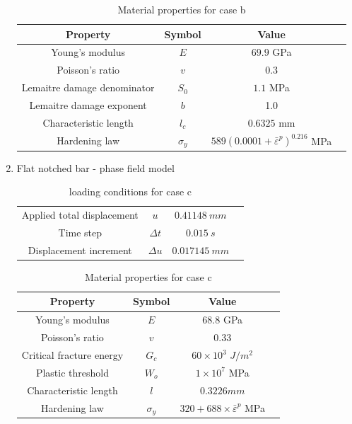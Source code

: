 \documentclass[sn-mathphys,Numbered,draft]{sn-jnl}%
\begin{document}
\begin{enumerate}[label=(\alph*)]
\begin{table}[htb]
	\centering
		\begin{tabular}{cccc} \hline
			Property & Symbol & Value  \\ \hline 
			Young's modulus & $E$ & $69.9$ GPa \\
			Poisson's ratio & $v$ & $0.3$   \\
			Lemaitre damage denominator & $S_0$ & $1.1$ MPa  \\
			Lemaitre damage exponent & $b$ & 1.0  \\
			Characteristic length & $l_c$ & $0.6325$ mm  \\
			Hardening law & $\sigma_y$ & $589({0.0001+\bar{\varepsilon}}^p)^{0.216}$ MPa \\
			\hline
		\end{tabular}
	\caption{Material properties for case b}
	\label{tab:material_properties}
\end{table}

\item Flat notched bar - phase field model
\begin{table}[htb]
	\centering
		\begin{tabular}{cccc} \hline
		    Applied total displacement & $u$ & $0.41148\ mm$ \\
		    Time step & $\Delta t$ & $0.015\ s$ \\
			Displacement increment  & $\Delta u$ & $0.017145\ mm$   \\
			\hline
		\end{tabular}
	\caption{loading conditions for case c}
	\label{tab:material_properties}
\end{table}

\begin{table}[htb]
	\centering
		\begin{tabular}{cccc} \hline
			Property & Symbol & Value  \\ \hline 
			Young's modulus & $E$ & $68.8$ GPa \\
			Poisson's ratio & $v$ & $0.33$   \\
			Critical fracture energy & $G_c$ & $60\times10^3$ $J/m^2$ \\
			Plastic threshold & $W_o$ & $1\times10^7$ MPa \\
			Characteristic length & $l$ & $0.3226mm$    \\
			Hardening law & $\sigma_y$ & $320+688\times{\bar{\varepsilon}}^p$ MPa  \\
			\hline
		\end{tabular}
	\caption{Material properties for case c}
	\label{tab:material_properties}
\end{table}
\end{enumerate}
\FloatBarrier
\end{document}

